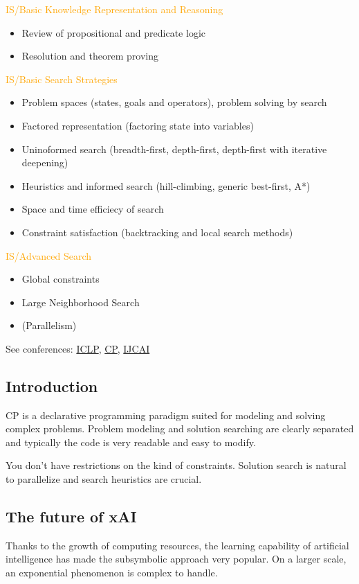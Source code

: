 \documentclass[11pt]{article}
\begin{document}
    \textcolor{orange}{IS/Basic Knowledge Representation and Reasoning}
    \begin{itemize}
        \item Review of propositional and predicate logic
        \item Resolution and theorem proving
    \end{itemize}

    \textcolor{orange}{IS/Basic Search Strategies}
    \begin{itemize}
        \item Problem spaces (states, goals and operators), problem solving by search
        \item Factored representation (factoring state into variables)
        \item Uninoformed search (breadth-first, depth-first, depth-first with iterative deepening)
        \item Heuristics and informed search (hill-climbing, generic best-first, A*)
        \item Space and time efficiecy of search
        \item Constraint satisfaction (backtracking and local search methods)
    \end{itemize}

    \textcolor{orange}{IS/Advanced Search}
    \begin{itemize}
        \item Global constraints
        \item Large Neighborhood Search
        \item (Parallelism)
    \end{itemize}

    See conferences: \href{iclp25.demacs.unical.it}{ICLP}, \href{cp2025.a4cp.org}{CP}, \href{2025.ijcai.org}{IJCAI}

\subsection{Introduction}
    CP is a declarative programming paradigm suited for modeling and solving complex problems. Problem modeling and solution searching are clearly separated and typically the code is very readable and easy to modify.
    
    You don't have restrictions on the kind of constraints.
    Solution search is natural to parallelize and search heuristics are crucial.

\subsection{The future of xAI}
    Thanks to the growth of computing resources, the learning capability of artificial intelligence has made the subsymbolic approach very popular. On a larger scale, an exponential phenomenon is complex to handle.
\end{document}

